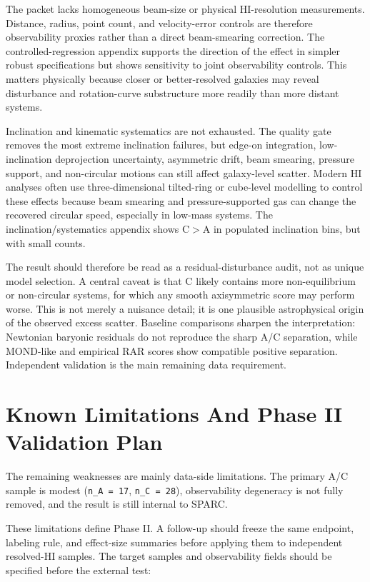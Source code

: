 \documentclass[11pt]{article}
\begin{document}
The packet lacks homogeneous beam-size or physical HI-resolution measurements. Distance, radius, point count, and velocity-error controls are therefore observability proxies rather than a direct beam-smearing correction. The controlled-regression appendix supports the direction of the effect in simpler robust specifications but shows sensitivity to joint observability controls. This matters physically because closer or better-resolved galaxies may reveal disturbance and rotation-curve substructure more readily than more distant systems.

Inclination and kinematic systematics are not exhausted. The quality gate removes the most extreme inclination failures, but edge-on integration, low-inclination deprojection uncertainty, asymmetric drift, beam smearing, pressure support, and non-circular motions can still affect galaxy-level scatter. Modern HI analyses often use three-dimensional tilted-ring or cube-level modelling to control these effects because beam smearing and pressure-supported gas can change the recovered circular speed, especially in low-mass systems. The inclination/systematics appendix shows C$>$A in populated inclination bins, but with small counts.

The result should therefore be read as a residual-disturbance audit, not as unique model selection. A central caveat is that C likely contains more non-equilibrium or non-circular systems, for which any smooth axisymmetric score may perform worse. This is not merely a nuisance detail; it is one plausible astrophysical origin of the observed excess scatter. Baseline comparisons sharpen the interpretation: Newtonian baryonic residuals do not reproduce the sharp A/C separation, while MOND-like and empirical RAR scores show compatible positive separation. Independent validation is the main remaining data requirement.

\section{Known Limitations And Phase II Validation Plan}
The remaining weaknesses are mainly data-side limitations. The primary A/C sample is modest (\texttt{n\_A = 17}, \texttt{n\_C = 28}), observability degeneracy is not fully removed, and the result is still internal to SPARC.

These limitations define Phase II. A follow-up should freeze the same endpoint, labeling rule, and effect-size summaries before applying them to independent resolved-HI samples. The target samples and observability fields should be specified before the external test:
\end{document}
